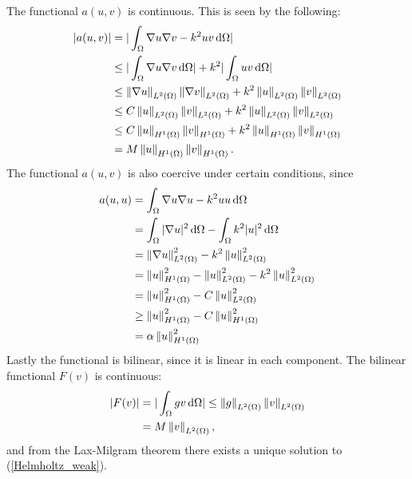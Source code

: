 \documentclass[10pt,a4paper]{article}
\begin{document}
The functional $a(u,v)$ is continuous. This is seen by the following:
\begin{align*}
|a(u,v)| &= |\int_\Omega  \nabla u \nabla v - k^2 u v \, \mathrm{d} \Omega| \\
 		& \leq |\int_\Omega \nabla u \nabla v \, \mathrm{d} \Omega| + k^2 |\int_\Omega u v \, \mathrm{d} \Omega| \\
 		& \leq \left\|\nabla u\right\|_{L^2(\Omega)} \left\|\nabla v\right\|_{L^2(\Omega)} + k^2 \left\|u\right\|_{L^2(\Omega)} \left\|v\right\|_{L^2(\Omega)} \\
 		& \leq C \left\|u\right\|_{L^2(\Omega)} \left\|v\right\|_{L^2(\Omega)} + k^2 \left\|u\right\|_{L^2(\Omega)} \left\|v\right\|_{L^2(\Omega)} \\
 		& \leq C \left\|u\right\|_{H^1(\Omega)} \left\|v\right\|_{H^1(\Omega)} + k^2 \left\|u\right\|_{H^1(\Omega)} \left\|v\right\|_{H^1(\Omega)} \\
 		& = M \left\|u\right\|_{H^1(\Omega)} \left\|v\right\|_{H^1(\Omega)}.
\end{align*}
The functional $a(u,v)$ is also coercive under certain conditions, since
\begin{align*}
a(u,u) &= \int_\Omega  \nabla u \nabla u - k^2 u u \, \mathrm{d} \Omega \\
 		& = \int_\Omega  |\nabla u|^2 \, \mathrm{d} \Omega - \int_{\Omega} k^2 |u|^2 \, \mathrm{d} \Omega \\
 		& =  \left\|\nabla u\right\|_{L^2(\Omega)}^2 - k^2 \left\|u\right\|_{L^2(\Omega)}^2\\
 		& = \left\|u\right\|_{H^1(\Omega)}^2 - \left\|u\right\|_{L^2(\Omega)}^2 - k^2 \left\|u\right\|_{L^2(\Omega)}^2\\
 		& = \left\|u\right\|_{H^1(\Omega)}^2 - C \left\|u\right\|_{L^2(\Omega)}^2\\
 		& \geq \left\|u\right\|_{H^1(\Omega)}^2 - C \left\|u\right\|_{H^1(\Omega)}^2\\
 		& = \alpha \left\|u\right\|_{H^1(\Omega)}^2
\end{align*}
Lastly the functional is bilinear, since it is linear in each component. The bilinear functional $F(v)$ is continuous:
\begin{align*}
|F(v)| &= |\int_\Omega gv \, \mathrm{d} \Omega| \leq \left\|g\right\|_{L^2(\Omega)} \left\|v\right\|_{L^2(\Omega)} \\
       &= M \left\|v\right\|_{L^2(\Omega)},
\end{align*}
and from the Lax-Milgram theorem there exists a unique solution to (\ref{Helmholtz_weak}).
\end{document}
